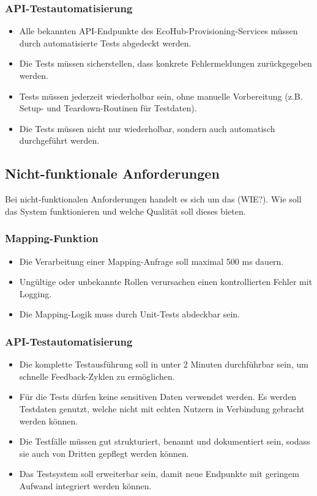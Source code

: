 \subsubsection{API-Testautomatisierung}
\begin{itemize}
    \item Alle bekannten API-Endpunkte des EcoHub-Provisioning-Services müssen durch automatisierte Tests abgedeckt werden. 
    \item Die Tests müssen sicherstellen, dass konkrete Fehlermeldungen zurückgegeben werden.
    \item Tests müssen jederzeit wiederholbar sein, ohne manuelle Vorbereitung (z.B. Setup- und Teardown-Routinen für Testdaten).
    \item Die Tests müssen nicht nur wiederholbar, sondern auch automatisch durchgeführt werden. 
\end{itemize}

\subsection{Nicht-funktionale Anforderungen}
Bei nicht-funktionalen Anforderungen handelt es sich um das (WIE?). Wie soll das System funktionieren und welche Qualität soll dieses bieten.
\subsubsection{Mapping-Funktion}
\begin{itemize}
    \item Die Verarbeitung einer Mapping-Anfrage soll maximal 500 ms dauern.
    \item Ungültige oder unbekannte Rollen verursachen einen kontrollierten Fehler mit Logging.
    \item Die Mapping-Logik muss durch Unit-Tests abdeckbar sein.
\end{itemize}
\subsubsection{API-Testautomatisierung}
\begin{itemize}
    \item Die komplette Testausführung soll in unter 2 Minuten durchführbar sein, um schnelle Feedback-Zyklen zu ermöglichen.
    \item Für die Tests dürfen keine sensitiven Daten verwendet werden. Es werden Testdaten genutzt, welche nicht mit echten Nutzern in Verbindung gebracht werden können.
    \item Die Testfälle müssen gut strukturiert, benannt und dokumentiert sein, sodass sie auch von Dritten gepflegt werden können.
    \item Das Testsystem soll erweiterbar sein, damit neue Endpunkte mit geringem Aufwand integriert werden können.
\end{itemize}

